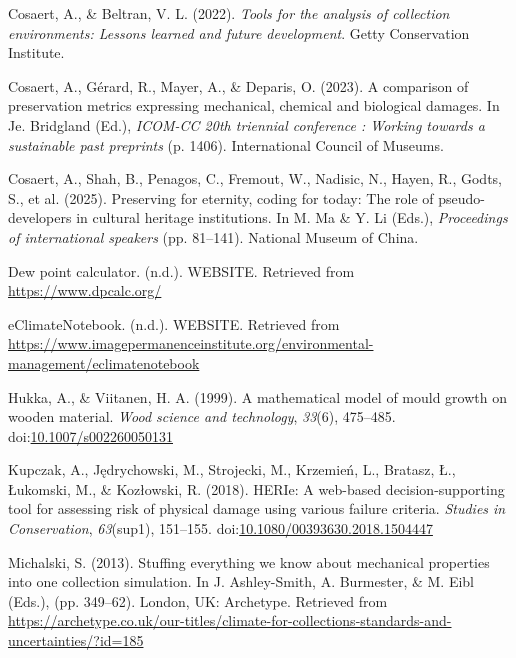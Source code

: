 \documentclass[
]{article}
\newlength{\cslhangindent}
\newenvironment{CSLReferences}[2] %
 {\begin{list}{}{%
  \setlength{\itemindent}{0pt}
  \setlength{\leftmargin}{0pt}
  \setlength{\parsep}{0pt}
  \ifodd #1
   \setlength{\leftmargin}{\cslhangindent}
   \setlength{\itemindent}{-1\cslhangindent}
  \fi
  \setlength{\itemsep}{#2\baselineskip}}}
 {\end{list}}
\begin{document}
\begin{CSLReferences}{1}{0}
Cosaert, A., \& Beltran, V. L. (2022). \emph{Tools for the analysis of
collection environments: Lessons learned and future development}. Getty
Conservation Institute.

Cosaert, A., Gérard, R., Mayer, A., \& Deparis, O. (2023). A comparison
of preservation metrics expressing mechanical, chemical and biological
damages. In Je. Bridgland (Ed.), \emph{ICOM-CC 20th triennial conference
: Working towards a sustainable past preprints} (p. 1406). International
Council of Museums.

Cosaert, A., Shah, B., Penagos, C., Fremout, W., Nadisic, N., Hayen, R.,
Godts, S., et al. (2025). Preserving for eternity, coding for today: The
role of pseudo-developers in cultural heritage institutions. In M. Ma \&
Y. Li (Eds.), \emph{Proceedings of international speakers} (pp.
81--141). National Museum of China.

Dew point calculator. (n.d.). WEBSITE. Retrieved from
\url{https://www.dpcalc.org/}

eClimateNotebook. (n.d.). WEBSITE. Retrieved from
\url{https://www.imagepermanenceinstitute.org/environmental-management/eclimatenotebook}

Hukka, A., \& Viitanen, H. A. (1999). A mathematical model of mould
growth on wooden material. \emph{Wood science and technology},
\emph{33}(6), 475--485.
doi:\href{https://doi.org/10.1007/s002260050131}{10.1007/s002260050131}

Kupczak, A., Jędrychowski, M., Strojecki, M., Krzemień, L., Bratasz, Ł.,
Łukomski, M., \& Kozłowski, R. (2018). {HERIe}: A web-based
decision-supporting tool for assessing risk of physical damage using
various failure criteria. \emph{Studies in Conservation},
\emph{63}(sup1), 151--155.
doi:\href{https://doi.org/10.1080/00393630.2018.1504447}{10.1080/00393630.2018.1504447}

Michalski, S. (2013). Stuffing everything we know about mechanical
properties into one collection simulation. In J. Ashley-Smith, A.
Burmester, \& M. Eibl (Eds.), (pp. 349--62). London, {UK}: Archetype.
Retrieved from
\url{https://archetype.co.uk/our-titles/climate-for-collections-standards-and-uncertainties/?id=185}


\end{CSLReferences}
\end{document}
